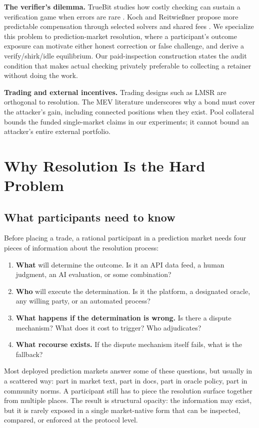\documentclass[10pt]{article}
\begin{document}
\textbf{The verifier's dilemma.} TrueBit studies how costly checking can sustain a verification game when errors are rare \cite{teutsch2019}. Koch and Reitwie\ss ner propose more predictable compensation through selected solvers and shared fees \cite{koch2018}. We specialize this problem to prediction-market resolution, where a participant's outcome exposure can motivate either honest correction or false challenge, and derive a verify/shirk/idle equilibrium. Our paid-inspection construction states the audit condition that makes actual checking privately preferable to collecting a retainer without doing the work.

\textbf{Trading and external incentives.} Trading designs such as LMSR \cite{hanson2002} are orthogonal to resolution. The MEV literature \cite{daian2019} underscores why a bond must cover the attacker's gain, including connected positions when they exist. Pool collateral bounds the funded single-market claims in our experiments; it cannot bound an attacker's entire external portfolio.

\section{Why Resolution Is the Hard Problem}

\subsection{What participants need to know}

Before placing a trade, a rational participant in a prediction market needs four pieces of information about the resolution process:

\begin{enumerate}
\item \textbf{What} will determine the outcome. Is it an API data feed, a human judgment, an AI evaluation, or some combination?
\item \textbf{Who} will execute the determination. Is it the platform, a designated oracle, any willing party, or an automated process?
\item \textbf{What happens if the determination is wrong.} Is there a dispute mechanism? What does it cost to trigger? Who adjudicates?
\item \textbf{What recourse exists.} If the dispute mechanism itself fails, what is the fallback?
\end{enumerate}

Most deployed prediction markets answer some of these questions, but usually in a scattered way: part in market text, part in docs, part in oracle policy, part in community norms. A participant still has to piece the resolution surface together from multiple places. The result is structural opacity: the information may exist, but it is rarely exposed in a single market-native form that can be inspected, compared, or enforced at the protocol level.
\end{document}
